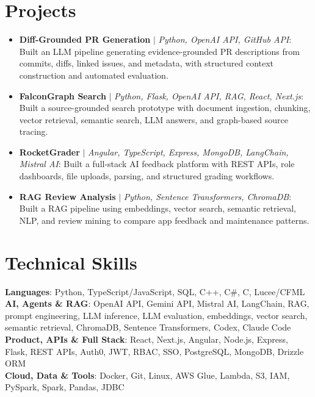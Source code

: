 \documentclass[letterpaper,11pt]{article}
\begin{document}
\section{Projects}
\begin{itemize}[leftmargin=0.15in, label={}, itemsep=-1pt, topsep=0pt, parsep=0pt]
  \item\small{\textbf{Diff-Grounded PR Generation} $|$ \emph{Python, OpenAI API, GitHub API}: Built an LLM pipeline generating evidence-grounded PR descriptions from commits, diffs, linked issues, and metadata, with structured context construction and automated evaluation.}
  \item\small{\textbf{FalconGraph Search} $|$ \emph{Python, Flask, OpenAI API, RAG, React, Next.js}: Built a source-grounded search prototype with document ingestion, chunking, vector retrieval, semantic search, LLM answers, and graph-based source tracing.}
  \item\small{\textbf{RocketGrader} $|$ \emph{Angular, TypeScript, Express, MongoDB, LangChain, Mistral AI}: Built a full-stack AI feedback platform with REST APIs, role dashboards, file uploads, parsing, and structured grading workflows.}
  \item\small{\textbf{RAG Review Analysis} $|$ \emph{Python, Sentence Transformers, ChromaDB}: Built a RAG pipeline using embeddings, vector search, semantic retrieval, NLP, and review mining to compare app feedback and maintenance patterns.}
\end{itemize}\vspace{-7pt}

\section{Technical Skills}
 \begin{itemize}[leftmargin=0.15in, label={}]
    \small{\item{
     \textbf{Languages}{: Python, TypeScript/JavaScript, SQL, C++, C\#, C, Lucee/CFML} \\
     \textbf{AI, Agents \& RAG}{: OpenAI API, Gemini API, Mistral AI, LangChain, RAG, prompt engineering, LLM inference, LLM evaluation, embeddings, vector search, semantic retrieval, ChromaDB, Sentence Transformers, Codex, Claude Code} \\
     \textbf{Product, APIs \& Full Stack}{: React, Next.js, Angular, Node.js, Express, Flask, REST APIs, Auth0, JWT, RBAC, SSO, PostgreSQL, MongoDB, Drizzle ORM} \\
     \textbf{Cloud, Data \& Tools}{: Docker, Git, Linux, AWS Glue, Lambda, S3, IAM, PySpark, Spark, Pandas, JDBC}
    }}
 \end{itemize}
\end{document}
